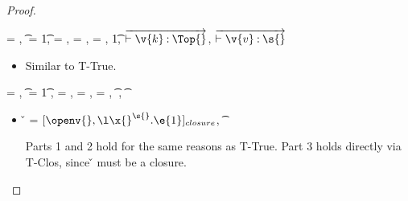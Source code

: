 \begin{lemma}
\begin{enumerate}
\begin{proof}
\begin{case}[T-Multi] \e{} = { {}},
  \t{} = {\MultiFntype {\s{}} {\t{1}}},
  {\thenprop {\prop{}}} = {\topprop{}},
  {\elseprop{\prop{}}} = {\botprop{}},
  {\object{}} = {\emptyobject{}},
  \judgementtwo {} { {\t{1}}},
  $\overrightarrow{\judgementtwo{}{\hastype{\v{k}}{\Top{}}}}$,
  $\overrightarrow{\judgementtwo{}{\hastype{\v{v}}{\s{}}}}$

  \begin{itemize}
    \item[]
      \begin{subcase}[B-Val]
        Similar to T-True.
      \end{subcase}
  \end{itemize}

\end{case}

\begin{case}[T-Abs] \e{} = {\abs {\x{}} {\s{}} {}},
  \t{} = {\ArrowOne {\x{}} {\s{}}
                                                      {\t{1}}
                                                      {
                                                                  {}}
                                                      {}},
  {\thenprop{\prop{}}}= {\topprop{}},
  {\elseprop{\prop{}}}= {\botprop{}},
  {\object{}}= {\emptyobject{}},
{ \judgement {\propenv{}, {\isprop {\s{}} {\x{}}}}
            { {\t{}}}
             {
                         {}}
             {}},
\judgement {\propenv{}} { {\t{}}}
                 {\filterset {\thenprop {\prop{}}}
                             {\elseprop {\prop{}}}}
                 {\object{}}

  \begin{itemize}
    \item[]
      \begin{subcase}[B-Abs]
        \v{} = ${\closure {\openv{}} {\abs {\x{}} {\s{}} {\e{1}}}}$,
          { \opsem {\openv{}}
                   {\abs {\x{}} {\t{}} {}}
                   {\closure {\openv{}} {\abs {\x{}} {\s{}} {}}}}

        Parts 1 and 2 hold for the same reasons as T-True.
        Part 3 holds directly via T-Clos, since \v{} must be a closure.
      \end{subcase}
  \end{itemize}
\end{case}


\end{proof}
\end{enumerate}
\end{lemma}
